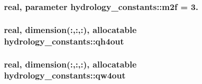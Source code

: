 \subsubsection[{\texorpdfstring{m2f}{m2f}}]{\setlength{\rightskip}{0pt plus 5cm}real, parameter hydrology\+\_\+constants\+::m2f = 3.}\hypertarget{namespacehydrology__constants_ab490db8c3db1149de2c3a999ca405462}{}\label{namespacehydrology__constants_ab490db8c3db1149de2c3a999ca405462}
\subsubsection[{\texorpdfstring{qh4out}{qh4out}}]{\setlength{\rightskip}{0pt plus 5cm}real, dimension(\+:,\+:,\+:), allocatable hydrology\+\_\+constants\+::qh4out}\hypertarget{namespacehydrology__constants_aab3e1ed337a2f4bb8ac1ae647b9ebd65}{}\label{namespacehydrology__constants_aab3e1ed337a2f4bb8ac1ae647b9ebd65}
\subsubsection[{\texorpdfstring{qw4out}{qw4out}}]{\setlength{\rightskip}{0pt plus 5cm}real, dimension(\+:,\+:,\+:), allocatable hydrology\+\_\+constants\+::qw4out}\hypertarget{namespacehydrology__constants_a4a968142e8621f39c2e739983340bb25}{}\label{namespacehydrology__constants_a4a968142e8621f39c2e739983340bb25}
